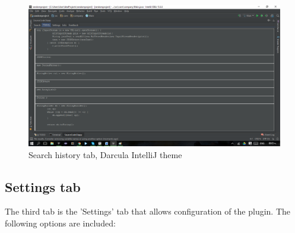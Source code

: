 \documentclass{l4proj}
\begin{document}
\begin{figure}[H]
\includegraphics[scale=0.4]{tab-history}
\centering
\caption{Search history tab, Darcula IntelliJ theme}
\label{fig:history-tab}
\end{figure}

\subsection{Settings tab}
The third tab is the 'Settings' tab that allows configuration of the plugin. The following options are included:\\
\end{document}

